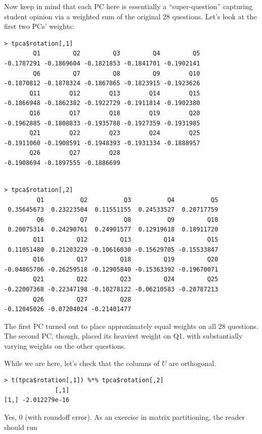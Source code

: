 Now keep in mind that each PC here is essentially a ``super-question''
capturing student opinion via a weighted sum of the original 28
questions.  Let's look at the first two PCs' weights:

\begin{lstlisting}
> tpca$rotation[,1]
        Q1         Q2         Q3         Q4         Q5 
-0.1787291 -0.1869604 -0.1821853 -0.1841701 -0.1902141 
        Q6         Q7         Q8         Q9        Q10 
-0.1870812 -0.1878324 -0.1867865 -0.1823915 -0.1923626 
       Q11        Q12        Q13        Q14        Q15 
-0.1866948 -0.1862382 -0.1922729 -0.1911814 -0.1902380 
       Q16        Q17        Q18        Q19        Q20 
-0.1962885 -0.1808833 -0.1935788 -0.1927359 -0.1931985 
       Q21        Q22        Q23        Q24        Q25 
-0.1911060 -0.1908591 -0.1948393 -0.1931334 -0.1888957 
       Q26        Q27        Q28 
-0.1908694 -0.1897555 -0.1886699 
\end{lstlisting}

\begin{lstlisting}

> tpca$rotation[,2]
         Q1          Q2          Q3          Q4          Q5 
 0.35645673  0.23223504  0.11551155  0.24533527  0.20717759 
         Q6          Q7          Q8          Q9         Q10 
 0.20075314  0.24290761  0.24901577  0.12919618  0.18911720 
        Q11         Q12         Q13         Q14         Q15 
 0.11051480  0.21203229 -0.10616030 -0.15629705 -0.15533847 
        Q16         Q17         Q18         Q19         Q20 
-0.04865706 -0.26259518 -0.12905840 -0.15363392 -0.19670071 
        Q21         Q22         Q23         Q24         Q25 
-0.22007368 -0.22347198 -0.10278122 -0.06210583 -0.20787213 
        Q26         Q27         Q28 
-0.12045026 -0.07204024 -0.21401477 
\end{lstlisting}

The first PC turned out to place approximately equal weights on all 28
questions.  The second PC, though, placed its heaviest weight on Q1,
with substantially varying weights on the other questions.

While we are here, let's check that the columns of $U$ are orthogonal.

\begin{lstlisting}
> t(tpca$rotation[,1]) %*% tpca$rotation[,2]
              [,1]
[1,] -2.012279e-16
\end{lstlisting}

Yes, 0 (with roundoff error).  As an exercise in matrix partitioning,
the reader should run

